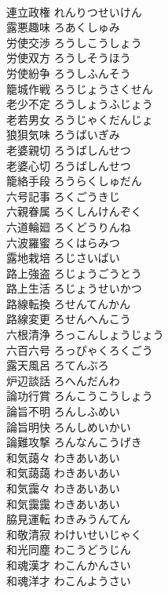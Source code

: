\documentclass[8pt]{extreport}
\begin{document}
\begin{CJK}{UTF8}{min}
\\	連立政権	れんりつせいけん	
\\	露悪趣味	ろあくしゅみ	
\\	労使交渉	ろうしこうしょう	
\\	労使双方	ろうしそうほう	
\\	労使紛争	ろうしふんそう	
\\	籠城作戦	ろうじょうさくせん	
\\	老少不定	ろうしょうふじょう	
\\	老若男女	ろうじゃくだんじょ	
\\	狼狽気味	ろうばいぎみ	
\\	老婆親切	ろうばしんせつ	
\\	老婆心切	ろうばしんせつ	
\\	籠絡手段	ろうらくしゅだん	
\\	六号記事	ろくごうきじ	
\\	六親眷属	ろくしんけんぞく	
\\	六道輪廻	ろくどうりんね	
\\	六波羅蜜	ろくはらみつ	
\\	露地栽培	ろじさいばい	
\\	路上強盗	ろじょうごうとう	
\\	路上生活	ろじょうせいかつ	
\\	路線転換	ろせんてんかん	
\\	路線変更	ろせんへんこう	
\\	六根清浄	ろっこんしょうじょう	
\\	六百六号	ろっぴゃくろくごう	
\\	露天風呂	ろてんぶろ	
\\	炉辺談話	ろへんだんわ	
\\	論功行賞	ろんこうこうしょう	
\\	論旨不明	ろんしふめい	
\\	論旨明快	ろんしめいかい	
\\	論難攻撃	ろんなんこうげき	
\\	和気藹々	わきあいあい	
\\	和気藹藹	わきあいあい	
\\	和気靄々	わきあいあい	
\\	和気靄靄	わきあいあい	
\\	脇見運転	わきみうんてん	
\\	和敬清寂	わけいせいじゃく	
\\	和光同塵	わこうどうじん	
\\	和魂漢才	わこんかんさい	
\\	和魂洋才	わこんようさい	

\end{CJK}
\end{document}
